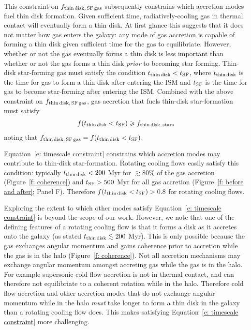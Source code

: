 \documentclass[fleqn,usenatbib]{mnras}
\begin{document}
This constraint on $f_{\rm thin\,disk,\,SF\,gas}$ subsequently constrains which accretion modes fuel thin disk formation.
Given sufficient time, radiatively-cooling gas in thermal contact will eventually form a thin disk.
At first glance this suggests that it does not matter how gas enters the galaxy:
any mode of gas accretion is capable of forming a thin disk given sufficient time for the gas to equilibriate.
However, whether or not the gas eventually forms a thin disk is less important than whether or not the gas forms a thin disk \textit{prior} to becoming star forming.
Thin-disk star-forming gas must satisfy the condition $t_{\rm thin\,disk} < t_{\rm SF}$, where $t_{\rm thin\,disk}$ is the time for gas to form a thin disk after entering the ISM and $t_{\rm SF}$ is the time for gas to become star-forming after entering the ISM.
Combined with the above constraint on $f_{\rm thin\,disk,\,SF\,gas}$, gas accretion that fuels thin-disk star-formation must satisfy
\begin{equation}
    f( t_{\rm thin\,disk} < t_{\rm SF} ) \ge f_{\rm thin\,disk,\,stars}
    \label{e: timescale constraint}
\end{equation}
noting that $f_{\rm thin\,disk,\,SF\,gas} = f( t_{\rm thin\,disk} < t_{\rm SF} )$.

Equation~\ref{e: timescale constraint} constrains which accretion modes may contribute to thin-disk star-formation.
Rotating cooling flows easily satisfy this condition:
typically $t_{\rm thin\,disk} < 200$ Myr for $\gtrsim 80\%$ of the gas accretion (Figure~\ref{f: coherence}) and $t_{\rm SF} > 500$ Myr for all gas accretion (Figure~\ref{f: before and after}; Panel F).
Therefore $f( t_{\rm thin\,disk} < t_{\rm SF} ) > 0.8$ for rotating cooling flows.

Exploring the extent to which other modes satisfy Equation~\ref{e: timescale constraint} is beyond the scope of our work.
However, we note that one of the defining features of a rotating cooling flow is that it forms a disk as it accretes onto the galaxy (as stated $t_{\rm thin\,disk} \lesssim 200$ Myr).
This is only possible because the gas exchanges angular momentum and gains coherence prior to accretion while the gas is in the halo (Figure~\ref{f: coherence}).
Not all accretion mechanisms may exchange angular momentum amongst accreting gas while the gas is in the halo.
For example supersonic cold flow accretion is not in thermal contact, and can therefore not equilibriate to a coherent rotation while in the halo.
Therefore cold flow accretion and other accretion modes that do not exchange angular momentum while in the halo \textit{must} take longer to form a thin disk in the galaxy than a rotating cooling flow does.
This makes satisfying Equation~\ref{e: timescale constraint} more challenging.
\end{document}
